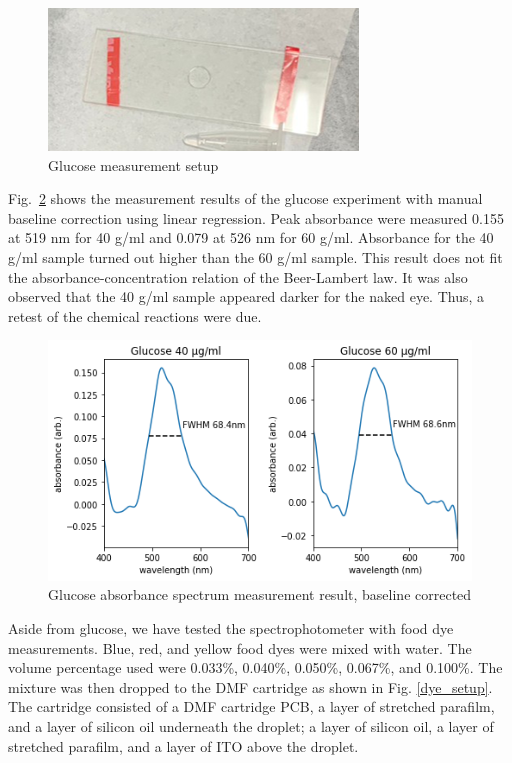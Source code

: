\documentclass[conference]{IEEEtran}
\begin{document}
\begin{figure}[htbp]
    \centerline{\includegraphics[scale=0.8]{mic_slide.png}}
    \caption{Glucose measurement setup}
    \label{mic_slide}
    \end{figure}

Fig.~\ref{glucose_result} shows the measurement results of the glucose experiment with manual baseline correction using linear regression.
Peak absorbance were measured 0.155 at 519 nm for 40 {\textmu}g/ml and 0.079 at 526 nm for 60 {\textmu}g/ml.
Absorbance for the 40 {\textmu}g/ml sample turned out higher than the 60 {\textmu}g/ml sample.
This result does not fit the absorbance-concentration relation of the Beer-Lambert law.
It was also observed that the 40 {\textmu}g/ml sample appeared darker for the naked eye.
Thus, a retest of the chemical reactions were due.

\begin{figure}[htbp]
    \centerline{\includegraphics[scale=0.5]{glucose-res.png}}
    \caption{Glucose absorbance spectrum measurement result, baseline corrected}
    \label{glucose_result}
    \end{figure}

Aside from glucose, we have tested the spectrophotometer with food dye measurements.
Blue, red, and yellow food dyes were mixed with water.
The volume percentage used were 0.033\%, 0.040\%, 0.050\%, 0.067\%, and 0.100\%.
The mixture was then dropped to the DMF cartridge as shown in Fig. \ref{dye_setup}.
The cartridge consisted of a DMF cartridge PCB, a layer of stretched parafilm, and a layer of silicon oil underneath the droplet;
a layer of silicon oil, a layer of stretched parafilm, and a layer of ITO above the droplet. 
\end{document}
